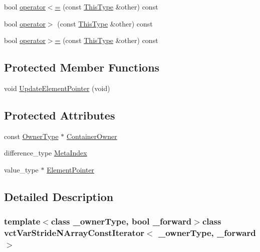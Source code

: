 \begin{DoxyCompactItemize}
\item 
bool \hyperlink{classvct_var_stride_n_array_const_iterator_a21773b18a4bdc93dbd56a07d41dd4b68}{operator$<$=} (const \hyperlink{classvct_var_stride_n_array_const_iterator_ac729d2af265785aad6fdd43a70fbffdb}{This\-Type} \&other) const 
\item 
bool \hyperlink{classvct_var_stride_n_array_const_iterator_aa67cb3208852e5d2519a69eb3c54b2ec}{operator$>$} (const \hyperlink{classvct_var_stride_n_array_const_iterator_ac729d2af265785aad6fdd43a70fbffdb}{This\-Type} \&other) const 
\item 
bool \hyperlink{classvct_var_stride_n_array_const_iterator_aacf54ef7d20d17635ad80cd4f636e0f2}{operator$>$=} (const \hyperlink{classvct_var_stride_n_array_const_iterator_ac729d2af265785aad6fdd43a70fbffdb}{This\-Type} \&other) const 
\end{DoxyCompactItemize}
\subsection*{Protected Member Functions}
\begin{DoxyCompactItemize}
\item 
void \hyperlink{classvct_var_stride_n_array_const_iterator_aa578e91dddecd98da9eedbfb2a75b3e0}{Update\-Element\-Pointer} (void)
\end{DoxyCompactItemize}
\subsection*{Protected Attributes}
\begin{DoxyCompactItemize}
\item 
const \hyperlink{classvct_var_stride_n_array_const_iterator_ac75d53a8defeee467ba9ebe2962e29ac}{Owner\-Type} $\ast$ \hyperlink{classvct_var_stride_n_array_const_iterator_a86106a192cd073058a176e51564e86d0}{Container\-Owner}
\item 
difference\-\_\-type \hyperlink{classvct_var_stride_n_array_const_iterator_a6f62ef67435fdd9f972f2f29cd0a011b}{Meta\-Index}
\item 
value\-\_\-type $\ast$ \hyperlink{classvct_var_stride_n_array_const_iterator_ac19e4e3a7c753b4893fd939d5d4077b1}{Element\-Pointer}
\end{DoxyCompactItemize}


\subsection{Detailed Description}
\subsubsection*{template$<$class \-\_\-owner\-Type, bool \-\_\-forward$>$class vct\-Var\-Stride\-N\-Array\-Const\-Iterator$<$ \-\_\-owner\-Type, \-\_\-forward $>$}


